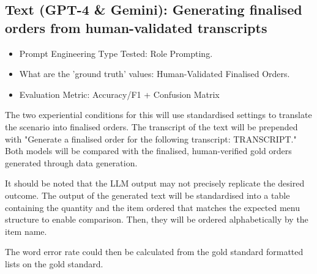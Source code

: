 
\subsection{Text (GPT-4 \& Gemini): Generating finalised orders from human-validated transcripts}

\begin{itemize}
    \item Prompt Engineering Type Tested: Role Prompting.
    \item What are the 'ground truth' values: Human-Validated Finalised Orders.
    \item Evaluation Metric: Accuracy/F1 + Confusion Matrix
\end{itemize}

The two experiential conditions for this will use standardised settings to translate the scenario into finalised orders. The transcript of the text will be prepended with "Generate a finalised order for the following transcript: TRANSCRIPT." Both models will be compared with the finalised, human-verified gold orders generated through data generation. 

It should be noted that the LLM output may not precisely replicate the desired outcome. The output of the generated text will be standardised into a table containing the quantity and the item ordered that matches the expected menu structure to enable comparison. Then, they will be ordered alphabetically by the item name. 

The word error rate could then be calculated from the gold standard formatted lists on the gold standard. 